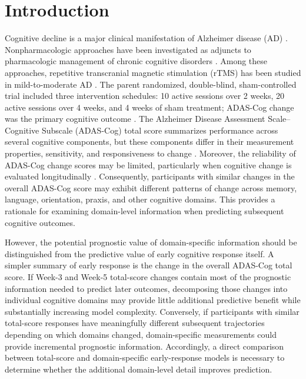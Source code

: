 \documentclass[11pt]{article}
\begin{document}
\section{Introduction}

Cognitive decline is a major clinical manifestation of Alzheimer disease (AD)
\citep{scheltens2021alzheimers}. Nonpharmacologic approaches have been investigated
as adjuncts to pharmacologic management of chronic cognitive disorders
\citep{olazaran2010nonpharmacological}. Among these approaches, repetitive
transcranial magnetic stimulation (rTMS) has been studied in mild-to-moderate AD
\citep{Xue2024}. The parent randomized, double-blind, sham-controlled trial included
three intervention schedules: 10 active sessions over 2 weeks, 20 active sessions over
4 weeks, and 4 weeks of sham treatment; ADAS-Cog change was the primary cognitive
outcome \citep{moussavi2021protocol,moussavi2024trial}. The Alzheimer Disease Assessment Scale--Cognitive Subscale (ADAS-Cog) total score
summarizes performance across several cognitive components, but these components
differ in their measurement properties, sensitivity, and responsiveness to change
\citep{cano2010parts,kueper2018adascog,verma2015scoring}. Moreover, the reliability
of ADAS-Cog change scores may be limited, particularly when cognitive change is
evaluated longitudinally \citep{grochowalski2016reliability}. Consequently,
participants with similar changes in the overall ADAS-Cog score may exhibit different
patterns of change across memory, language, orientation, praxis, and other cognitive
domains. This provides a rationale for examining domain-level information when
predicting subsequent cognitive outcomes.

However, the potential prognostic value of domain-specific information should be
distinguished from the predictive value of early cognitive response itself. A simpler
summary of early response is the change in the overall ADAS-Cog total score. If
Week-3 and Week-5 total-score changes contain most of the prognostic information
needed to predict later outcomes, decomposing those changes into individual cognitive
domains may provide little additional predictive benefit while substantially increasing
model complexity. Conversely, if participants with similar total-score responses have
meaningfully different subsequent trajectories depending on which domains changed,
domain-specific measurements could provide incremental prognostic information.
Accordingly, a direct comparison between total-score and domain-specific early-response
models is necessary to determine whether the additional domain-level detail improves
prediction.
\end{document}
